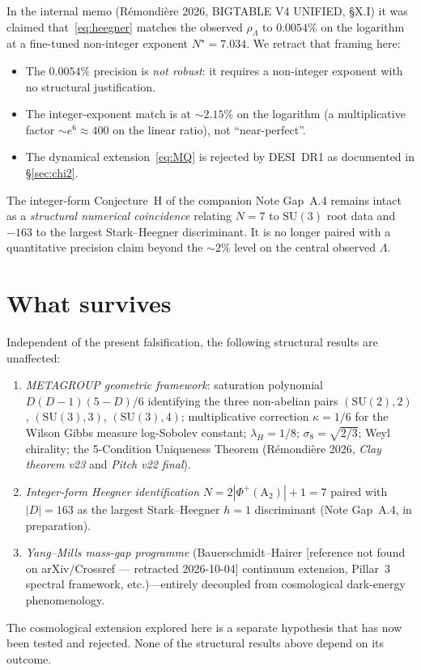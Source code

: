 \documentclass[11pt,letterpaper,twoside]{article}
\newcommand{\rL}{\rho_{\Lambda}}
\newcommand{\SUthree}{\mathrm{SU}(3)}
\begin{document}
In the internal memo (R\'emondi\`ere 2026, BIGTABLE V4 UNIFIED, \S X.I) it was
claimed that~\eqref{eq:heegner} matches the observed $\rL$ to $0.0054\%$ on the
logarithm at a fine-tuned non-integer exponent $N^{\star}=7.034$.
We retract that framing here:
\begin{itemize}[leftmargin=*,topsep=0.1em,itemsep=0.1em]
\item The $0.0054\%$ precision is \emph{not robust}: it requires a non-integer
      exponent with no structural justification.
\item The integer-exponent match is at $\sim2.15\%$ on the logarithm
      (a multiplicative factor $\sim e^{6}\approx400$ on the linear ratio),
      not ``near-perfect''.
\item The dynamical extension~\eqref{eq:MQ} is rejected by DESI~DR1 as
      documented in \S\ref{sec:chi2}.
\end{itemize}
The integer-form Conjecture~H of the companion Note Gap~A.4 remains intact as a
\emph{structural numerical coincidence} relating $N=7$ to $\SUthree$ root data
and $-163$ to the largest Stark--Heegner discriminant.
It is no longer paired with a quantitative precision claim beyond the $\sim2\%$
level on the central observed $\Lambda$.

\section{What survives}\label{sec:survives}

Independent of the present falsification, the following structural results are
unaffected:
\begin{enumerate}[leftmargin=*,topsep=0.1em,itemsep=0.1em]
\item \emph{METAGROUP geometric framework}: saturation polynomial
      $D(D-1)(5-D)/6$ identifying the three non-abelian pairs $(\mathrm{SU}(2),2)$,
      $(\SUthree,3)$, $(\SUthree,4)$; multiplicative correction $\kappa=1/6$
      for the Wilson Gibbs measure log-Sobolev constant; $\lambda_{H}=1/8$;
      $\sigma_{8}=\sqrt{2/3}$; Weyl chirality; the 5-Condition Uniqueness
      Theorem (R\'emondi\`ere 2026, \emph{Clay theorem v23} and
      \emph{Pitch v22 final}).
\item \emph{Integer-form Heegner identification} $N=2|\Phi^{+}(\mathrm{A}_{2})|+1=7$
      paired with $|D|=163$ as the largest Stark--Heegner $h=1$ discriminant
      (Note Gap~A.4, in preparation).
\item \emph{Yang--Mills mass-gap programme} (Bauerschmidt--Hairer [reference not found on arXiv/Crossref --- retracted 2026-10-04] continuum
      extension, Pillar~3 spectral framework, etc.)---entirely decoupled from
      cosmological dark-energy phenomenology.
\end{enumerate}
The cosmological extension explored here is a separate hypothesis that has now
been tested and rejected. None of the structural results above depend on its
outcome.
\end{document}
